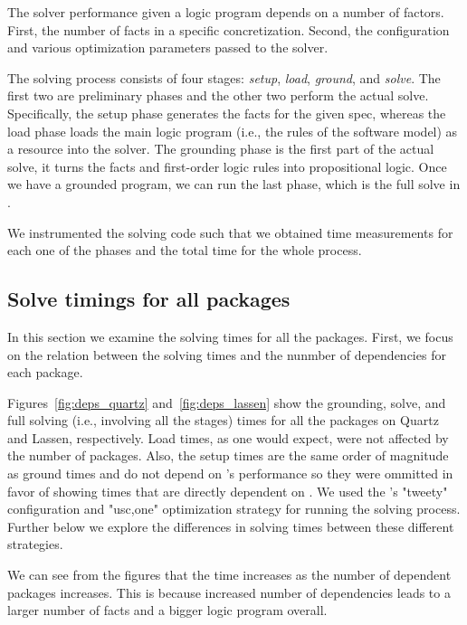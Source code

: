 
The \clingo{} solver performance given a logic program depends
on a number of factors. First, the number of facts in a specific concretization. Second,
the configuration and various optimization parameters passed to the solver. 

The solving process consists of four stages: \emph{setup}, \emph{load}, 
\emph{ground}, and \emph{solve}. The first two are preliminary phases and the other two 
perform the actual solve. Specifically, the setup phase generates the facts for the given
spec, whereas the load phase loads the main logic program (i.e., the rules of the software 
model) as a resource into the solver. The grounding phase is the first part of the actual
solve, it turns the facts and first-order logic rules into propositional logic. Once we
have a grounded program, we can run the last phase, which is the full solve in \clingo{}.

We instrumented the solving code such that we obtained time measurements for each one
of the phases and the total time for the whole process.


\subsection{Solve timings for all packages}

In this section we examine the solving times for all the packages. First, we focus on
the relation between the solving times and the nunmber of dependencies for each package.





Figures~\ref{fig:deps_quartz} and~\ref{fig:deps_lassen} show the grounding, solve, and full solving (i.e., involving all the stages) times for all the packages on Quartz and Lassen, respectively. Load times, as one would expect, were not affected by the number of packages. Also, the setup times are the same order of magnitude as ground times and do not depend on \clingo{}'s performance so they were ommitted in favor of showing times that are directly dependent on \clingo{}. We used the \clingo{}'s "tweety" configuration and "usc,one" optimization strategy for running the solving process. Further below we explore the differences in solving times between these different strategies.

We can see from the figures that the time increases as the number of dependent packages increases. This is because increased number of dependencies leads to a larger number of facts and a bigger logic program overall. 


